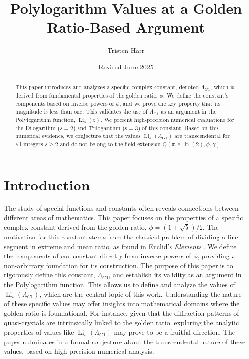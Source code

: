 \documentclass{amsart}
\theoremstyle{plain}
\theoremstyle{definition}
\theoremstyle{remark}
\DeclareMathOperator{\Li}{Li} %
\newcommand{\LambdaG}{\Lambda_{G1}}
\begin{document}
\title[Polylogarithms at a Golden Ratio Argument]{Polylogarithm Values at a Golden Ratio-Based Argument}
\author{Tristen Harr}
\date{Revised June 2025}

\begin{abstract}
This paper introduces and analyzes a specific complex constant, denoted $\LambdaG$, which is derived from fundamental properties of the golden ratio, $\phi$. We define the constant's components based on inverse powers of $\phi$, and we prove the key property that its magnitude is less than one. This validates the use of $\LambdaG$ as an argument in the Polylogarithm function, $\Li_s(z)$. We present high-precision numerical evaluations for the Dilogarithm ($s=2$) and Trilogarithm ($s=3$) of this constant. Based on this numerical evidence, we conjecture that the values $\Li_s(\LambdaG)$ are transcendental for all integers $s \ge 2$ and do not belong to the field extension $\mathbb{Q}(\pi, e, \ln(2), \phi, \gamma)$.
\end{abstract}

\maketitle

\section{Introduction}
The study of special functions and constants often reveals connections between different areas of mathematics. This paper focuses on the properties of a specific complex constant derived from the golden ratio, $\phi = (1+\sqrt{5})/2$. The motivation for this constant stems from the classical problem of dividing a line segment in extreme and mean ratio, as found in Euclid's \textit{Elements} \cite{Euclid}. We define the components of our constant directly from inverse powers of $\phi$, providing a non-arbitrary foundation for its construction. The purpose of this paper is to rigorously define this constant, $\LambdaG$, and establish its validity as an argument in the Polylogarithm function. This allows us to define and analyze the values of $\Li_s(\LambdaG)$, which are the central topic of this work. Understanding the nature of these specific values may offer insights into mathematical domains where the golden ratio is foundational. For instance, given that the diffraction patterns of quasi-crystals are intrinsically linked to the golden ratio, exploring the analytic properties of values like $\Li_s(\LambdaG)$ may prove to be a fruitful direction. The paper culminates in a formal conjecture about the transcendental nature of these values, based on high-precision numerical analysis.
\end{document}
